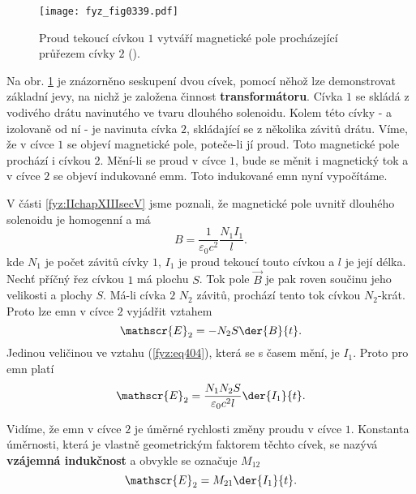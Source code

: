   \begin{figure}[ht!]  %
    \centering
    \texttt{[image: fyz\_fig0339.pdf]}
    \caption{Proud tekoucí cívkou \(1\) vytváří magnetické pole procházející průřezem cívky \(2\)
             (\cite[s.~304]{Feynman02}).}
    \label{fyz:fig0339}
  \end{figure}
  
  Na obr. \ref{fyz:fig0339} je znázorněno seskupení dvou cívek, pomocí něhož lze demonstrovat 
  základní jevy, na nichž je založena činnost \textbf{transformátoru}. Cívka \(1\) se skládá z 
  vodivého drátu navinutého ve tvaru dlouhého solenoidu. Kolem této cívky - a izolovaně od ní - je 
  navinuta cívka \(2\), skládající se z několika závitů drátu. Víme, že v cívce \(1\) se objeví 
  magnetické pole, poteče-li jí proud. Toto magnetické pole prochází i cívkou \(2\). Mění-li se 
  proud v cívce \(1\), bude se měnit i magnetický tok a v cívce \(2\) se objeví indukované emm. 
  Toto indukované emn nyní vypočítáme.
  
  V části \ref{fyz:IIchapXIIIsecV} jsme poznali, že magnetické pole uvnitř dlouhého solenoidu je 
  homogenní a má
  \begin{equation}\label{fyz:eq404}
    B = \frac{1}{\varepsilon_0c^2}\frac{N_1I_1}{l}.
  \end{equation}
  kde \(N_1\) je počet závitů cívky \(1\), \(I_1\) je proud tekoucí touto cívkou a \(l\) je její 
  délka. Nechť příčný řez cívkou \(1\) má plochu \(S\). Tok pole \(\vec{B}\) je pak roven součinu 
  jeho velikosti a plochy \(S\). Má-li cívka \(2\) \(N_2\) závitů, prochází tento tok cívkou 
  \(N_2\)-krát. Proto lze emn v cívce \(2\) vyjádřit vztahem
  \begin{equation}\label{fyz:eq405}
    \mathscr{E}_2 = -N_2S\der{B}{t}.
  \end{equation}
  Jedinou veličinou ve vztahu (\ref{fyz:eq404}), která se s časem mění, je \(I_1\). Proto pro emn 
  platí
  \begin{equation}\label{fyz:eq406}
    \mathscr{E}_2 = \frac{N_1N_2S}{\varepsilon_0c^2l}\der{I_1}{t}.
  \end{equation}
  
  Vidíme, že emn v cívce \(2\) je úměrné rychlosti změny proudu v cívce \(1\). Konstanta úměrnosti, 
  která je vlastně geometrickým faktorem těchto cívek, se nazývá \textbf{vzájemná indukčnost} a 
  obvykle se označuje \(M_{12}\)
  \begin{equation}\label{fyz:eq407}
    \mathscr{E}_2 = M_{21}\der{I_1}{t}.
  \end{equation}
  
